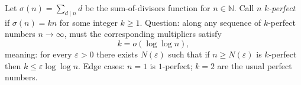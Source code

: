 Let $\sigma(n)=\sum_{d\mid n} d$ be the sum-of-divisors function for $n\in\mathbb{N}$.
Call $n$ \emph{$k$-perfect} if $\sigma(n)=k n$ for some integer $k\ge 1$.
Question: along any sequence of $k$-perfect numbers $n\to\infty$, must the corresponding multipliers satisfy
\[
k = o(\log\log n),
\]
meaning: for every $\varepsilon>0$ there exists $N(\varepsilon)$ such that if $n\ge N(\varepsilon)$ is $k$-perfect then $k\le \varepsilon\log\log n$.
Edge cases: $n=1$ is $1$-perfect; $k=2$ are the usual perfect numbers.
